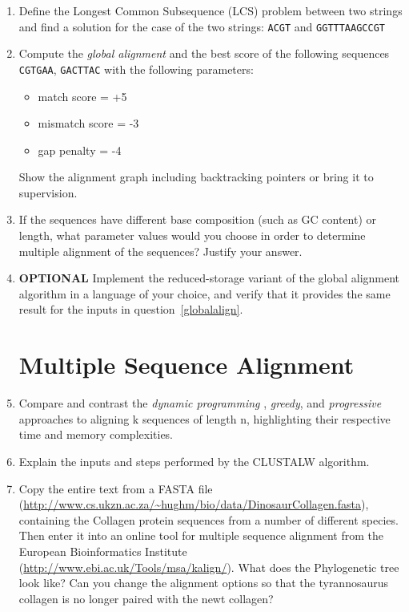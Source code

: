 \documentclass[11pt,runningheads,a4paper]{article}
\newcommand{\DNA}[1]{\texttt{\uppercase{#1}}}
\begin{document}
\begin{enumerate}
	\item Define the Longest Common Subsequence (LCS) problem between two strings and find a solution for the case of the two strings: \DNA{ACGT} and \DNA{GGTTTAAGCCGT}

  \item\label{globalalign} Compute the \textit{global alignment} and the best score of the following sequences \DNA{CGTGAA}, \DNA{GACTTAC} with the following parameters:
\begin{itemize}
  \item match score = +5
  \item mismatch score = -3
  \item gap penalty = -4
\end{itemize}
Show the alignment graph including backtracking pointers or bring it to supervision.

	\item If the sequences have different base composition (such as GC content) or length, what parameter values would you choose in order to determine multiple alignment of the sequences?  Justify your answer.
  \item  \textbf{OPTIONAL} Implement the reduced-storage variant of the global alignment algorithm in a language of your choice, and verify that it provides the same result for the inputs in question~\ref{globalalign}.

\section*{Multiple Sequence Alignment}

\item Compare and contrast the \textit{ dynamic programming }, \textit{greedy}, and \textit{progressive} approaches to aligning k sequences of length n, highlighting their respective time and memory complexities.

\item Explain the inputs and steps performed by the CLUSTALW algorithm.
  
\item Copy the entire text from a FASTA file (\url{http://www.cs.ukzn.ac.za/~hughm/bio/data/DinosaurCollagen.fasta}), containing the Collagen protein sequences from a number of different species. 
  Then enter it into an online tool for multiple sequence alignment from the European Bioinformatics Institute (\url{http://www.ebi.ac.uk/Tools/msa/kalign/}). 
  What does the Phylogenetic tree look like? Can you change the alignment options so that the tyrannosaurus collagen is no longer paired with the newt collagen?


\end{enumerate}
\end{document}
